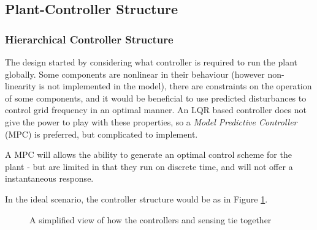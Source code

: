 \subsection{Plant-Controller Structure}
\subsubsection{Hierarchical Controller Structure}

The design started by considering what controller is required to run the plant globally. 
Some components are nonlinear in their behaviour (however non-linearity is not implemented in the model), there are constraints on the operation of some components, and it would be beneficial to use predicted disturbances to control grid frequency in an optimal manner.
An LQR based controller does not give the power to play with these properties, so a \emph{Model Predictive Controller} (MPC) is preferred, but complicated to implement.

A MPC will allows the ability to generate an optimal control scheme for the plant - but are limited in that they run on discrete time, and will not offer a instantaneous response.


In the ideal scenario, the controller structure would be as in Figure \ref{fig:schematic}.

\begin{figure}[thb]
        \centering
\usetikzlibrary{arrows}
        \caption{A simplified view of how the controllers and sensing tie together} \label{fig:schematic}
\end{figure}

